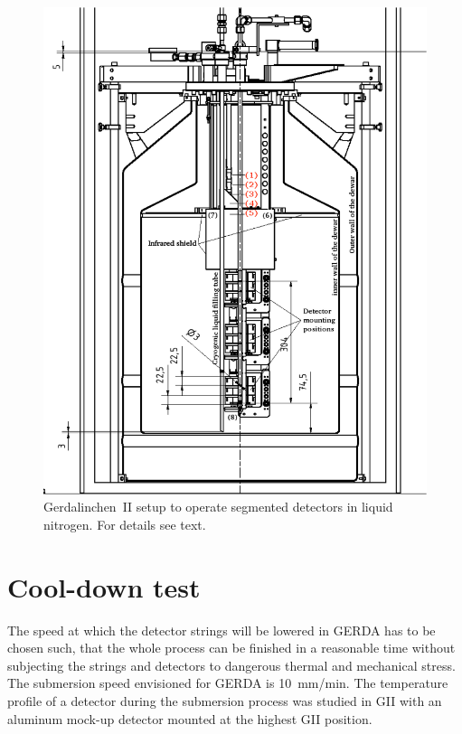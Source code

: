 \begin{figure}[hbtp]
\centering
\includegraphics[width=\textwidth]{GIIscheme}
\caption{Gerdalinchen~II setup to operate segmented detectors in liquid nitrogen. For details see text.}
\label{fig:ii:sch}
\end{figure}

\section{Cool-down test}
\label{sec:ii:cool}
The speed at which the detector strings will be lowered in GERDA has
to be chosen such, that the whole process can be finished in a
reasonable time without subjecting the strings and detectors to
dangerous thermal and mechanical stress. The submersion speed
envisioned for GERDA is 10~mm/min. The temperature profile of a
detector during the submersion process was studied in GII with an
aluminum mock-up detector mounted at the highest GII position.


